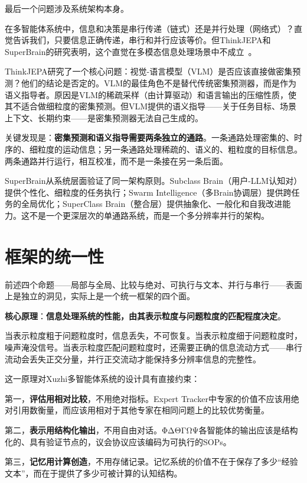 \documentclass[11pt]{article}
\begin{document}
最后一个问题涉及系统架构本身。

在多智能体系统中，信息和决策是串行传递（链式）还是并行处理（网络式）？直觉告诉我们，只要信息正确传递，串行和并行应该等价。但ThinkJEPA和SuperBrain的研究表明，这个直觉在多模态信息处理场景中不成立~\cite{thinkjepa,superbrain}。

ThinkJEPA研究了一个核心问题：视觉-语言模型（VLM）是否应该直接做密集预测？他们的结论是否定的。VLM的最佳角色不是替代传统密集预测器，而是作为语义指导者。原因是VLM的稀疏采样（由计算驱动）和语言输出的压缩性质，使其不适合做细粒度的密集预测。但VLM提供的语义指导——关于任务目标、场景上下文、长期约束——是密集预测器无法自己生成的。

关键发现是：\textbf{密集预测和语义指导需要两条独立的通路}。一条通路处理密集的、时序的、细粒度的运动信息；另一条通路处理稀疏的、语义的、粗粒度的目标信息。两条通路并行运行，相互校准，而不是一条接在另一条后面。

SuperBrain从系统层面验证了同一架构原则。Subclass Brain（用户-LLM认知对）提供个性化、细粒度的任务执行；Swarm Intelligence（多Brain协调层）提供跨任务的全局优化；SuperClass Brain（整合层）提供抽象化、一般化和自我改进能力。这不是一个更深层次的单通路系统，而是一个多分辨率并行的架构。

\section{框架的统一性}

前述四个命题——局部与全局、比较与绝对、可执行与文本、并行与串行——表面上是独立的洞见，实际上是一个统一框架的四个面。

\textbf{核心原理}：\textbf{信息处理系统的性能，由其表示粒度与问题粒度的匹配程度决定}。

当表示粒度粗于问题粒度时，信息丢失，不可恢复。当表示粒度细于问题粒度时，噪声淹没信号。当表示粒度匹配问题粒度时，还需要正确的信息流动方式——串行流动会丢失正交分量，并行正交流动才能保持多分辨率信息的完整性。

这一原理对Xuzhi多智能体系统的设计具有直接约束：

第一，\textbf{评估用相对比较}，不用绝对指标。Expert Tracker中专家的价值不应该用绝对引用数衡量，而应该用相对于其他专家在相同问题上的比较优势衡量。

第二，\textbf{表示用结构化输出}，不用自由对话。ΦΔΘΓΩΨ各智能体的输出应该是结构化的、具有验证节点的，议会协议应该编码为可执行的SOPs。

第三，\textbf{记忆用计算创造}，不用存储记录。记忆系统的价值不在于保存了多少``经验文本''，而在于提供了多少可被计算的认知结构。
\end{document}
